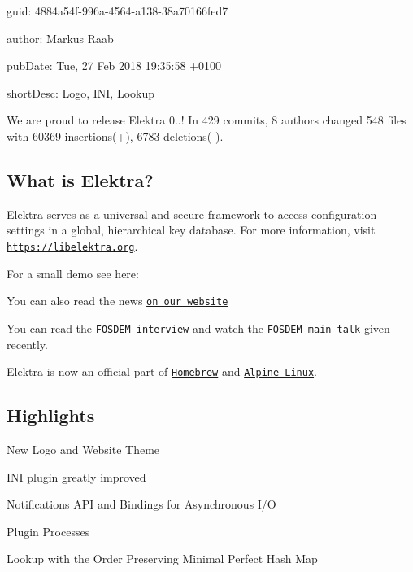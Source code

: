 
\begin{DoxyItemize}
\item guid\+: 4884a54f-\/996a-\/4564-\/a138-\/38a70166fed7
\item author\+: Markus Raab
\item pub\+Date\+: Tue, 27 Feb 2018 19\+:35\+:58 +0100
\item short\+Desc\+: Logo, I\+NI, Lookup
\end{DoxyItemize}

We are proud to release Elektra 0..! In 429 commits, 8 authors changed 548 files with 60369 insertions(+), 6783 deletions(-\/).

\subsection*{What is Elektra?}

Elektra serves as a universal and secure framework to access configuration settings in a global, hierarchical key database. For more information, visit \href{https://libelektra.org}{\tt https\+://libelektra.\+org}.

For a small demo see here\+:

\href{https://asciinema.org/a/cantr04assr4jkv8v34uz9b8r}{\tt }

You can also read the news \href{https://www.libelektra.org/news/0.8.22-release}{\tt on our website}

You can read the \href{https://fosdem.org/2018/interviews/markus-raab/}{\tt F\+O\+S\+D\+EM interview} and watch the \href{https://fosdem.org/2018/schedule/event/elektra/}{\tt F\+O\+S\+D\+EM main talk} given recently.

Elektra is now an official part of \href{http://formulae.brew.sh/formula/elektra}{\tt Homebrew} and \href{https://pkgs.alpinelinux.org/package/edge/testing/x86_64/elektra}{\tt Alpine Linux}.

\subsection*{Highlights}


\begin{DoxyItemize}
\item New Logo and Website Theme
\item I\+NI plugin greatly improved
\item Notifications A\+PI and Bindings for Asynchronous I/O
\item Plugin Processes
\item Lookup with the Order Preserving Minimal Perfect Hash Map
\end{DoxyItemize}

